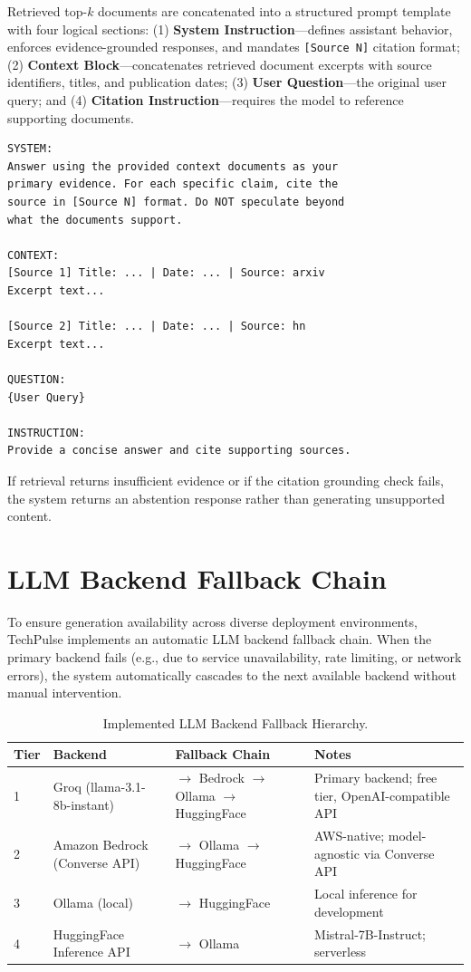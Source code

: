 \documentclass[12pt,a4paper]{report}
\begin{document}
Retrieved top-$k$ documents are concatenated into a structured prompt template with four logical sections: (1) \textbf{System Instruction}---defines assistant behavior, enforces evidence-grounded responses, and mandates \texttt{[Source N]} citation format; (2) \textbf{Context Block}---concatenates retrieved document excerpts with source identifiers, titles, and publication dates; (3) \textbf{User Question}---the original user query; and (4) \textbf{Citation Instruction}---requires the model to reference supporting documents.

\begin{lstlisting}[caption={Implemented Structured Generation Prompt Template.}, label={lst:prompt}]
SYSTEM:
Answer using the provided context documents as your
primary evidence. For each specific claim, cite the
source in [Source N] format. Do NOT speculate beyond
what the documents support.

CONTEXT:
[Source 1] Title: ... | Date: ... | Source: arxiv
Excerpt text...

[Source 2] Title: ... | Date: ... | Source: hn
Excerpt text...

QUESTION:
{User Query}

INSTRUCTION:
Provide a concise answer and cite supporting sources.
\end{lstlisting}

If retrieval returns insufficient evidence or if the citation grounding check fails, the system returns an abstention response rather than generating unsupported content.

\section{LLM Backend Fallback Chain}
\label{sec:llm_fallback}

To ensure generation availability across diverse deployment environments, TechPulse implements an automatic LLM backend fallback chain. When the primary backend fails (e.g., due to service unavailability, rate limiting, or network errors), the system automatically cascades to the next available backend without manual intervention.

\begin{table}[H]
\caption{Implemented LLM Backend Fallback Hierarchy.}
\label{tab:llm_backends}
\centering
\begin{tabular}{p{0.5cm}p{3.5cm}p{4.0cm}p{4.0cm}}
\toprule
\textbf{Tier} & \textbf{Backend} & \textbf{Fallback Chain} & \textbf{Notes} \\
\midrule
1 & Groq (llama-3.1-8b-instant) & $\to$ Bedrock $\to$ Ollama $\to$ HuggingFace & Primary backend; free tier, OpenAI-compatible API \\
2 & Amazon Bedrock (Converse API) & $\to$ Ollama $\to$ HuggingFace & AWS-native; model-agnostic via Converse API \\
3 & Ollama (local) & $\to$ HuggingFace & Local inference for development \\
4 & HuggingFace Inference API & $\to$ Ollama & Mistral-7B-Instruct; serverless \\
\bottomrule
\end{tabular}
\end{table}
\end{document}
